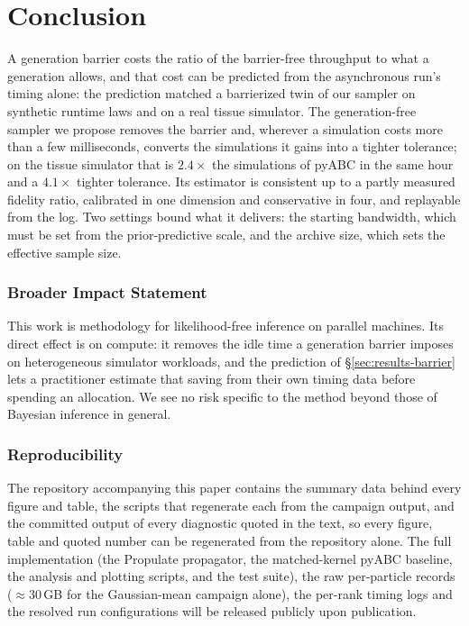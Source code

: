\documentclass[10pt]{article}
\theoremstyle{plain}
\theoremstyle{definition}
\begin{document}
\section{Conclusion}\label{sec:conclusion}
A generation barrier costs the ratio of the barrier-free throughput to what a generation allows, and that cost can be predicted from the asynchronous run's timing alone: the prediction matched a barrierized twin of our sampler on synthetic runtime laws and on a real tissue simulator. The generation-free sampler we propose removes the barrier and, wherever a simulation costs more than a few milliseconds, converts the simulations it gains into a tighter tolerance; on the tissue simulator that is $2.4\times$ the simulations of pyABC in the same hour and a $4.1\times$ tighter tolerance. Its estimator is consistent up to a partly measured fidelity ratio, calibrated in one dimension and conservative in four, and replayable from the log. Two settings bound what it delivers: the starting bandwidth, which must be set from the prior-predictive scale, and the archive size, which sets the effective sample size.

\subsubsection*{Broader Impact Statement}
This work is methodology for likelihood-free inference on parallel machines. Its direct effect is on compute: it removes the idle time a generation barrier imposes on heterogeneous simulator workloads, and the prediction of \S\ref{sec:results-barrier} lets a practitioner estimate that saving from their own timing data before spending an allocation. We see no risk specific to the method beyond those of Bayesian inference in general.

\subsubsection*{Reproducibility}
The repository accompanying this paper contains the summary data behind every figure and table, the scripts that regenerate each from the campaign output, and the committed output of every diagnostic quoted in the text, so every figure, table and quoted number can be regenerated from the repository alone. The full implementation (the Propulate propagator, the matched-kernel pyABC baseline, the analysis and plotting scripts, and the test suite), the raw per-particle records (${\approx}30$\,GB for the Gaussian-mean campaign alone), the per-rank timing logs and the resolved run configurations will be released publicly upon publication.
\end{document}
